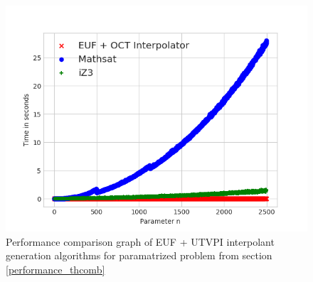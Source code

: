 \begin{figure}
  \centering
  \includegraphics[scale=0.9]{figures/thci_performance_graph_large}
  \caption{Performance comparison graph of EUF + UTVPI 
    interpolant generation
    algorithms for paramatrized problem from section 
  \ref{performance_thcomb}} 
  \label{performance_graph_thcomb}
\end{figure}

